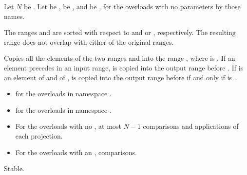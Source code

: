 \begin{itemdescr}
\pnum
Let $N$ be .
Let  be ,
 be , and
 be ,
for the overloads with no parameters by those names.

\pnum
\expects
The ranges  and 
are sorted with respect to  and  or ,
respectively.
The resulting range does not overlap with either of the original ranges.

\pnum
\effects
Copies all the elements of the two ranges  and
 into the range ,
where  is .
If an element  precedes  in an input range,
 is copied into the output range before .
If  is an element of  and
 of ,
 is copied into the output range before  if and only if
is .

\pnum
\returns
\begin{itemize}
\item
  for the overloads in namespace .
\item
  for the overloads in namespace .
\end{itemize}

\pnum
\complexity
\begin{itemize}
\item
  For the overloads with no ,
  at most $N - 1$ comparisons and applications of each projection.
\item
  For the overloads with an ,  comparisons.
\end{itemize}

\pnum
\remarks
Stable.
\end{itemdescr}

